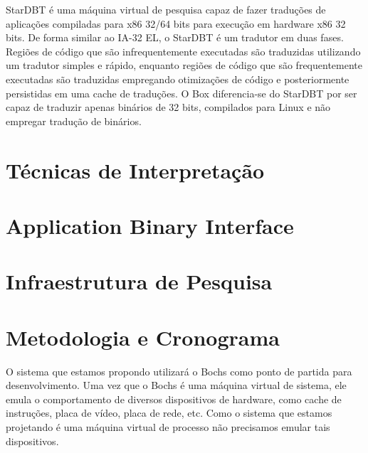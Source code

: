 \documentclass[11pt,twoside]{article}
\begin{document}
StarDBT \cite{stardbt} é uma máquina virtual de pesquisa capaz de fazer traduções de
aplicações compiladas para x86 32/64 bits para execução em hardware x86 32 bits.
De forma similar ao IA-32 EL, o StarDBT é um tradutor em duas fases. Regiões de
código que são infrequentemente executadas são traduzidas utilizando um tradutor
simples e rápido, enquanto regiões de código que são frequentemente executadas
são traduzidas empregando otimizações de código e posteriormente persistidas
em uma cache de traduções. O Box diferencia-se do StarDBT por ser capaz de traduzir
apenas binários de 32 bits, compilados para Linux e não empregar tradução
de binários.

\section{Técnicas de Interpretação}


\section{Application Binary Interface}


\section{Infraestrutura de Pesquisa}
%


\section{Metodologia e Cronograma}
%

O sistema que estamos propondo utilizará o Bochs como ponto de partida
para desenvolvimento. Uma vez que o Bochs é uma máquina virtual de sistema,
ele emula o comportamento de diversos dispositivos de hardware, como
cache de instruções, placa de vídeo, placa de rede, etc. Como o sistema
que estamos projetando é uma máquina virtual de processo não precisamos
emular tais dispositivos. 
\end{document}
